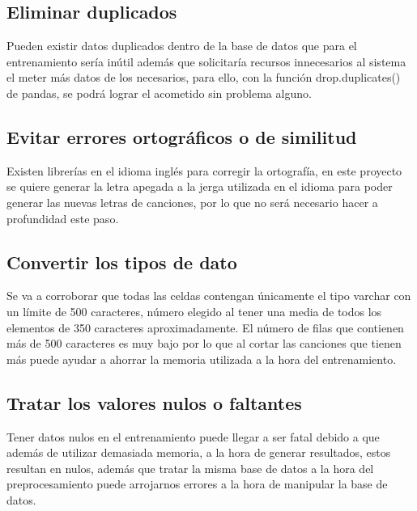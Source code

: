 \documentclass[12pt, a4paper, titlepage]{report}
\begin{document}
		\subsection{Eliminar duplicados} 
		Pueden existir datos duplicados dentro de la base de datos que para el entrenamiento sería inútil además que solicitaría recursos innecesarios al sistema el meter más datos de los necesarios, para ello, con la función drop.duplicates() de pandas, se podrá lograr el acometido sin problema alguno.
		
		\subsection{Evitar errores ortográficos o de similitud}
		Existen librerías en el idioma inglés para corregir la ortografía, en este proyecto se quiere generar la letra apegada a la jerga utilizada en el idioma para poder generar las nuevas letras de canciones, por lo que no será necesario hacer a profundidad este paso.
		
		\subsection{Convertir los tipos de dato} 
		Se va a corroborar que todas las celdas contengan únicamente el tipo varchar con un límite de 500 caracteres, número elegido al tener una media de todos los elementos de 350 caracteres aproximadamente. El número de filas que contienen más de 500 caracteres es muy bajo por lo que al cortar las canciones que tienen más puede ayudar a ahorrar la memoria utilizada a la hora del entrenamiento.
		\subsection{Tratar los valores nulos o faltantes} 
		Tener datos nulos en el entrenamiento puede llegar a ser fatal debido a que además de utilizar demasiada memoria, a la hora de generar resultados, estos resultan en nulos, además que tratar la misma base de datos a la hora del preprocesamiento puede arrojarnos errores a la hora de manipular la base de datos.
		
\end{document}
